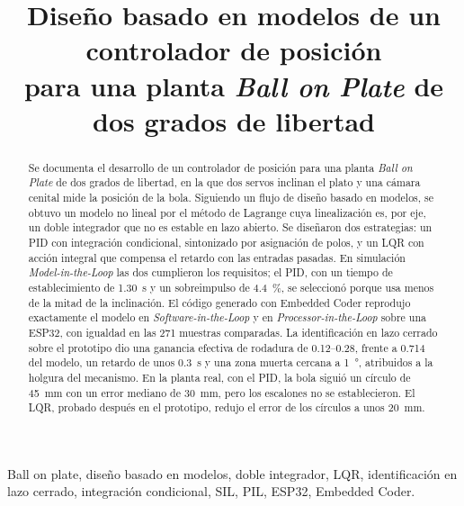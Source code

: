 \documentclass[conference,a4paper,10pt]{IEEEtran}
\begin{document}
\title{Diseño basado en modelos de un controlador de posición\\
para una planta \emph{Ball on Plate} de dos grados de libertad}

\author{%
%
}

\maketitle

\begin{abstract}
Se documenta el desarrollo de un controlador de posición para una planta \emph{Ball on Plate} de
dos grados de libertad, en la que dos servos inclinan el plato y una cámara cenital mide la
posición de la bola. Siguiendo un flujo de diseño basado en modelos, se obtuvo un modelo no
lineal por el método de Lagrange cuya linealización es, por eje, un doble integrador que no es
estable en lazo abierto. Se diseñaron dos estrategias: un PID con integración condicional,
sintonizado por asignación de polos, y un LQR con acción integral que compensa el retardo con
las entradas pasadas. En simulación \emph{Model-in-the-Loop} las dos cumplieron los requisitos; el
PID, con un tiempo de establecimiento de \SI{1.30}{\second} y un sobreimpulso de
\SI{4.4}{\percent}, se seleccionó porque usa menos de la mitad de la inclinación. El código generado con Embedded Coder reprodujo exactamente el modelo en
\emph{Software-in-the-Loop} y en \emph{Processor-in-the-Loop} sobre una ESP32, con igualdad en las
\num{271} muestras comparadas. La identificación en lazo cerrado sobre el prototipo dio una
ganancia efectiva de rodadura de \numrange{0.12}{0.28}, frente a \num{0.714} del modelo, un
retardo de unos \SI{0.3}{\second} y una zona muerta cercana a \SI{1}{\degree}, atribuidos a la
holgura del mecanismo. En la planta real, con el PID, la bola siguió un círculo de \SI{45}{\milli\metre} con un error
mediano de \SI{30}{\milli\metre}, pero los escalones no se establecieron. El LQR, probado después
en el prototipo, redujo el error de los círculos a unos \SI{20}{\milli\metre}.
\end{abstract}

\begin{IEEEkeywords}
Ball on plate, diseño basado en modelos, doble integrador, LQR, identificación en lazo cerrado,
integración condicional, SIL, PIL, ESP32, Embedded Coder.
\end{IEEEkeywords}










\balance


\end{document}
